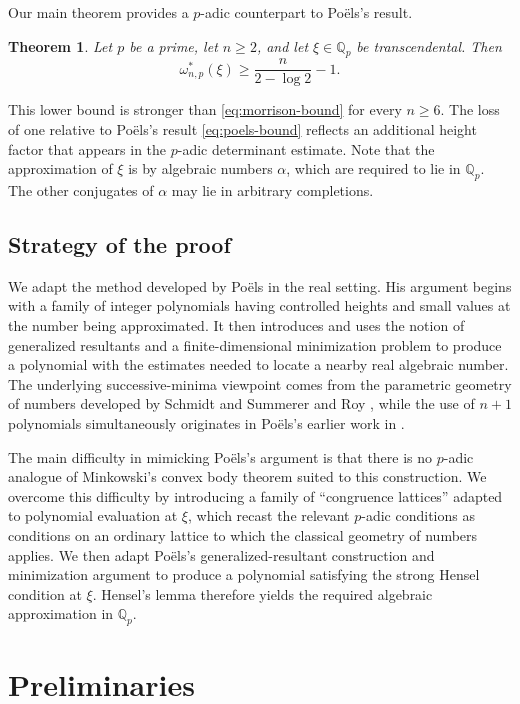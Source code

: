 \documentclass[12pt,reqno]{amsart}
\newtheorem{theorem}{Theorem}[section]
\theoremstyle{definition}
\theoremstyle{remark}
\newcommand{\Qp}{\mathbb Q_p}
\begin{document}
Our main theorem provides a $p$-adic counterpart to Po\"els's result.

\begin{theorem}\label{thm:main}
Let $p$ be a prime, let $n\geq2$, and let $\xi\in\Qp$ be transcendental. Then
$$
\omega^*_{n,p}(\xi)
\geq\frac{n}{2-\log2}-1.
$$
\end{theorem}

This lower bound is stronger than \eqref{eq:morrison-bound} for every $n\geq6$. The loss of one relative to Po\"els's result \eqref{eq:poels-bound} reflects an additional height factor that appears in the $p$-adic determinant estimate.
Note that the approximation of $\xi$ is by algebraic numbers $\alpha$, which are required to lie in $\Qp$.
The other conjugates of $\alpha$ may lie in arbitrary completions.

\subsection{Strategy of the proof}

We adapt the method developed by Po\"els \cite{PoelsWirsing} in the real
setting. His argument begins with a family of integer polynomials having
controlled heights and small values at the number being approximated. It then
introduces and uses the notion of generalized resultants and a finite-dimensional minimization problem to
produce a polynomial with the estimates needed to locate a nearby real algebraic
number. The underlying successive-minima viewpoint comes from the parametric
geometry of numbers developed by Schmidt and Summerer
\cite{SchmidtSummerer2009,SchmidtSummerer2013} and Roy \cite{Roy}, while the use of
$n+1$ polynomials simultaneously originates in Po\"els's earlier work in
\cite{PoelsUniform}.

The main difficulty in mimicking Po\"els's argument is that there is no
$p$-adic analogue of Minkowski's convex body theorem suited to this
construction. We overcome this difficulty by introducing a family of ``congruence lattices'' adapted to
 polynomial evaluation at $\xi$, which recast the relevant $p$-adic conditions as conditions on an ordinary
lattice to which the classical geometry of numbers applies. We then adapt
Po\"els's generalized-resultant construction and minimization argument to
produce a polynomial satisfying the strong Hensel condition at $\xi$.
Hensel's lemma therefore yields the required algebraic approximation in
$\Qp$.


\bigskip
\section{\bf Preliminaries}
\bigskip
\end{document}
